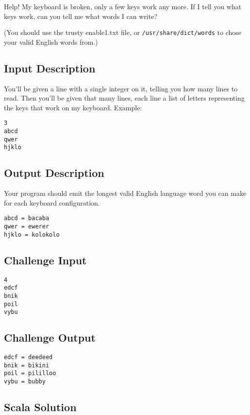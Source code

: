 Help! My keyboard is broken, only a few keys work any more. If I tell
you what keys work, can you tell me what words I can write?

(You should use the trusty enable1.txt file, or
\texttt{/usr/share/dict/words} to chose your valid English words from.)

\subsection{Input Description}\label{input-description-1}

You'll be given a line with a single integer on it, telling you how many
lines to read. Then you'll be given that many lines, each line a list of
letters representing the keys that work on my keyboard. Example:

\begin{verbatim}
3
abcd
qwer
hjklo
\end{verbatim}

\subsection{Output Description}\label{output-description-1}

Your program should emit the longest valid English language word you can
make for each keyboard configuration.

\begin{verbatim}
abcd = bacaba
qwer = ewerer
hjklo = kolokolo
\end{verbatim}

\subsection{Challenge Input}\label{challenge-input-2}

\begin{verbatim}
4
edcf
bnik
poil
vybu
\end{verbatim}

\subsection{Challenge Output}\label{challenge-output-1}

\begin{verbatim}
edcf = deedeed
bnik = bikini
poil = pililloo
vybu = bubby
\end{verbatim}

\subsection{Scala Solution}\label{scala-solution-2}

